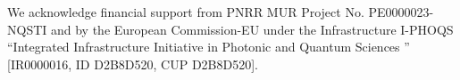 \documentclass[aps,preprint,singlecolumn,nopacs,superscriptaddress,groupedaddress]{revtex4}
\begin{document}
We acknowledge financial support from PNRR MUR Project No. PE0000023-NQSTI and by the
European Commission-EU under the Infrastructure I-PHOQS “Integrated Infrastructure Initiative
in Photonic and Quantum Sciences ” [IR0000016, ID D2B8D520, CUP D2B8D520].





\end{document}
